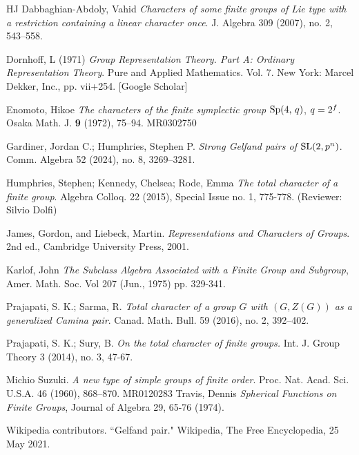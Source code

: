 \documentclass{amsart}
\begin{document}
\begin{thebibliography}{HJ}
Dabbaghian-Abdoly, Vahid  
\emph{Characters of some finite groups of Lie type with a restriction containing a linear character once}. 
J. Algebra 309 (2007), no. 2, 543--558.



 Dornhoff, L (1971) \emph{Group Representation Theory. Part A: Ordinary Representation Theory}. Pure and Applied Mathematics. Vol. 7. New York: Marcel Dekker, Inc., pp. vii+254. [Google Scholar]

Enomoto, Hikoe \emph{The characters of the finite symplectic group} ${\rm Sp}(4,\,q)$, $q=2\sp{f}$. Osaka Math. J. \textbf{9} (1972), 75--94. MR0302750

 

Gardiner, Jordan C.; Humphries, Stephen P. \emph{Strong Gelfand pairs of ${\rm SL}(2,p^n)$}. Comm. Algebra 52 (2024), no. 8, 3269--3281. 


 Humphries, Stephen; Kennedy, Chelsea; Rode, Emma \emph{The total character of a finite group}. Algebra Colloq. 22 (2015), Special Issue no. 1, 775-778. (Reviewer: Silvio Dolfi)

 

James, Gordon, and Liebeck, Martin. \emph{Representations and Characters of Groups}. 2nd ed., Cambridge University Press, 2001.



Karlof, John \emph{The Subclass Algebra Associated with a Finite Group and Subgroup}, Amer. Math. Soc. Vol 207 (Jun., 1975) pp. 329-341.

  

 Prajapati, S. K.; Sarma, R. \emph{Total character of a group $G$ with $(G, Z(G))$ as a generalized Camina pair}. Canad. Math. Bull. 59 (2016), no. 2, 392--402.

 Prajapati, S. K.; Sury, B. \emph{On the total character of finite groups.} Int. J. Group Theory 3 (2014), no. 3, 47-67.

 


Michio Suzuki. \emph{A new type of simple groups of finite order}. Proc. Nat. Acad. Sci. U.S.A.
46 (1960), 868--870. MR0120283
 Travis, Dennis \emph{Spherical Functions on Finite Groups}, Journal of Algebra 29, 65-76 (1974).


 Wikipedia contributors. ``Gelfand pair." Wikipedia, The Free Encyclopedia, 25 May 2021.







\end{thebibliography}
\end{document}
